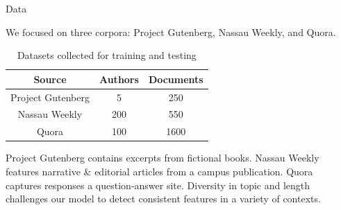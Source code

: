 \documentclass[final]{beamer}
\newlength{\onecolwid}
\newlength{\twocolwid}
\begin{document}
\begin{frame}[t]
\begin{columns}[t]
\begin{column}{\twocolwid}

\begin{columns}[t,totalwidth=\twocolwid] %

\begin{column}{\onecolwid} %

\vspace{-29mm}
\begin{block}{Data}

We focused on three corpora: Project Gutenberg, Nassau Weekly, and Quora. 

\vspace{5 mm}

\begin{table}[ht] 
\caption{Datasets collected for training and testing}
\centering
\begin{tabular}{ c | c | c }
  Source & Authors & Documents \\
  \hline
  Project Gutenberg & 5 & 250 \\
  Nassau Weekly & 200 & 550 \\
  Quora & 100 & 1600 \\
\end{tabular}
\end{table}

\vspace{10 mm}

Project Gutenberg contains excerpts from fictional books. Nassau Weekly features narrative \& editorial articles from a campus publication. Quora captures responses a question-answer site. Diversity in topic and length challenges our model to detect consistent features in a variety of contexts.

\end{block}


\end{column} %

\begin{column}{\onecolwid} %



\end{column}
\end{columns}
\end{column}
\end{columns}
\end{frame}
\end{document}
